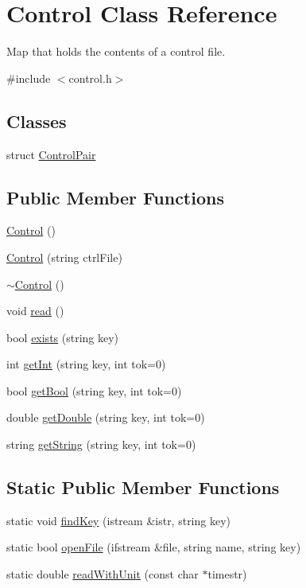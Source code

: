 \hypertarget{class_control}{}\section{Control Class Reference}
\label{class_control}


Map that holds the contents of a control file.  




{\ttfamily \#include $<$control.\+h$>$}

\subsection*{Classes}
\begin{DoxyCompactItemize}
\item 
struct \hyperlink{struct_control_1_1_control_pair}{Control\+Pair}
\end{DoxyCompactItemize}
\subsection*{Public Member Functions}
\begin{DoxyCompactItemize}
\item 
\hyperlink{class_control_aa730aeda4517f40bc48ba1e46ebded77}{Control} ()
\item 
\hyperlink{class_control_a38ef2c3af6c8ed025fe1e32eaecde245}{Control} (string ctrl\+File)
\item 
\hyperlink{class_control_aedda1328c4f8b8d49bca8f0812d3bfd1}{$\sim$\+Control} ()
\item 
void \hyperlink{class_control_afeadb02134927ebd335d2ded31a080bc}{read} ()
\item 
bool \hyperlink{class_control_a25a6868383ae1da8c2dcfc9e1c08c9b7}{exists} (string key)
\item 
int \hyperlink{class_control_a1ab6db178c602c6a5d5f5b48edc01f61}{get\+Int} (string key, int tok=0)
\item 
bool \hyperlink{class_control_a50d1f887dd09e6292e4e07360be79824}{get\+Bool} (string key, int tok=0)
\item 
double \hyperlink{class_control_aacf80fb72e8d797d1b5396634e41ddc4}{get\+Double} (string key, int tok=0)
\item 
string \hyperlink{class_control_afdb5c4d692d258d9ba3b1a3596e10a4f}{get\+String} (string key, int tok=0)
\end{DoxyCompactItemize}
\subsection*{Static Public Member Functions}
\begin{DoxyCompactItemize}
\item 
static void \hyperlink{class_control_ac81ea08780126671aa88b90654f8a4fa}{find\+Key} (istream \&istr, string key)
\item 
static bool \hyperlink{class_control_ab2c73097c22b0f2693e5c86ff01d2775}{open\+File} (ifstream \&file, string name, string key)
\item 
static double \hyperlink{class_control_a22c3e26d6a7e40451a72ed6f25b45728}{read\+With\+Unit} (const char $\ast$timestr)
\end{DoxyCompactItemize}

